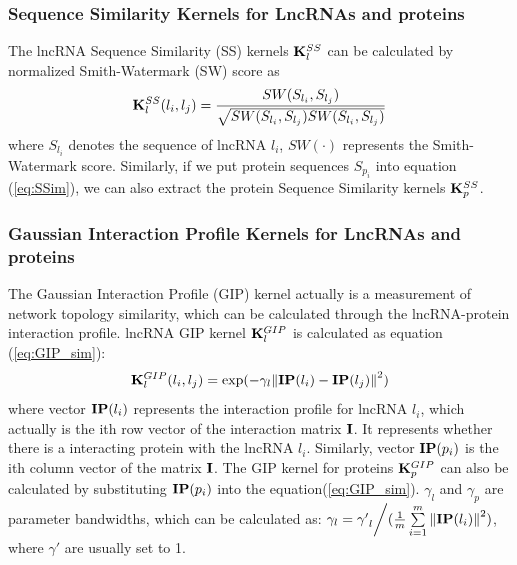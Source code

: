 \documentclass[fleqn,10pt]{wlscirep}
\begin{document}
\subsubsection*{Sequence Similarity Kernels for LncRNAs and proteins}
The lncRNA Sequence Similarity (SS) kernels ${\bf{K}}_l^{SS}$ can be calculated by normalized Smith-Watermark (SW) score as\cite{Shen2019}
\begin{equation}
{\bf{K}}_l^{SS}({l_i},{l_j}) = \frac{{SW({S_{{l_i}}},{S_{{l_j}}})}}{{\sqrt {SW({S_{{l_i}}},{S_{{l_j}}})SW({S_{{l_i}}},{S_{{l_j}}})} }} \label{eq:SSim}
\end{equation}
where ${{S_{{l_i}}}}$ denotes the sequence of lncRNA ${l_i}$, $SW( \cdot )$ represents the Smith-Watermark score. Similarly, if we put protein sequences ${{S_{{p_i}}}}$ into equation (\ref{eq:SSim}), we can also extract the protein Sequence Similarity kernels ${\bf{K}}_p^{SS}$.

\subsubsection*{Gaussian Interaction Profile Kernels for LncRNAs and proteins}
The Gaussian Interaction Profile (GIP) kernel actually is a measurement of network topology similarity\cite{VanLaarhoven2011}, which can be calculated through the lncRNA-protein interaction profile. lncRNA GIP kernel ${\bf{K}}_l^{GIP}$ is calculated as equation (\ref{eq:GIP_sim}):
\begin{equation} \label{eq:GIP_sim}
{\bf{K}}_l^{GIP}({l_i},{l_j}) = \exp ( - {\gamma _l}{\left\| {{\bf{IP}}({l_i}) - {\bf{IP}}({l_j})} \right\|^2})
\end{equation}
where vector ${{\bf{IP}}({l_i})}$ represents the interaction profile for lncRNA $l_i$, which actually is the ith row vector of the interaction matrix ${\bf{I}}$. It represents whether there is a interacting protein with the lncRNA $l_i$. Similarly, vector ${{\bf{IP}}({p_i})}$ is the ith column vector of the matrix ${\bf{I}}$. The GIP kernel for proteins ${\bf{K}}_p^{GIP}$ can also be calculated by substituting ${{\bf{IP}}({p_i})}$ into the equation(\ref{eq:GIP_sim}).
   ${\gamma _l}$ and ${\gamma _p}$ are parameter bandwidths, which can be calculated as: ${\gamma _l} = {{{{\gamma '}_l}} \mathord{\left/
 {\vphantom {{{{\gamma '}_l}} {(\frac{1}{m}\sum\limits_{i = 1}^m {{{\left\| {{\bf{IP}}({l_i})} \right\|}^2}} )}}} \right.
 \kern-\nulldelimiterspace} {(\frac{1}{m}\sum\limits_{i = 1}^m {{{\left\| {{\bf{IP}}({l_i})} \right\|}^2}} )}}$, where ${\gamma '}$ are usually set to 1.
\end{document}
